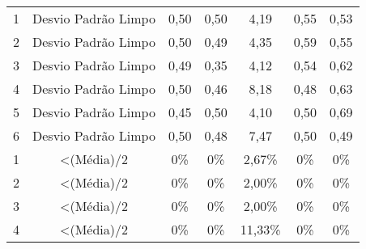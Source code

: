 \begin{table}[]
\begin{tabular}{|c|c|ccccc|}
1                         & Desvio Padrão Limpo                                                        & 0,50                      & 0,50                      & 4,19                      & 0,55                      & 0,53                       \\
2                         & Desvio Padrão Limpo                                                        & 0,50                      & 0,49                      & 4,35                      & 0,59                      & 0,55                       \\
3                         & Desvio Padrão Limpo                                                        & 0,49                      & 0,35                      & 4,12                      & 0,54                      & 0,62                       \\
4                         & Desvio Padrão Limpo                                                        & 0,50                      & 0,46                      & 8,18                      & 0,48                      & 0,63                       \\
5                         & Desvio Padrão Limpo                                                        & 0,45                      & 0,50                      & 4,10                      & 0,50                      & 0,69                       \\
6                         & Desvio Padrão Limpo                                                        & 0,50                      & 0,48                      & 7,47                      & 0,50                      & 0,49                       \\ \hline
1                         & \textless (Média)/2                                                        & 0\%                    & 0\%                    & 2,67\%                    & 0\%                    & 0\%                     \\
2                         & \textless (Média)/2                                                        & 0\%                    & 0\%                    & 2,00\%                    & 0\%                    & 0\%                     \\
3                         & \textless (Média)/2                                                        & 0\%                    & 0\%                    & 2,00\%                    & 0\%                    & 0\%                     \\
4                         & \textless (Média)/2                                                        & 0\%                    & 0\%                    & 11,33\%                   & 0\%                    & 0\%                     \\

\end{tabular}
\end{table}
